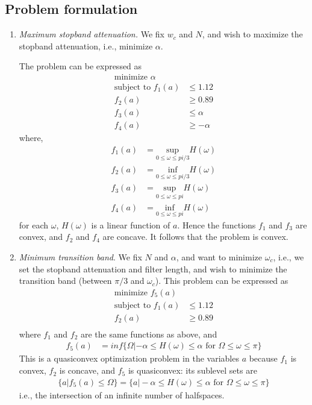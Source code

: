 \documentclass[conference]{IEEEtran}
\begin{document}
\subsection{Problem formulation}
\begin{enumerate}[label=(\alph*)]
\item \textit{Maximum stopband attenuation.} We fix $w_c$ and $N$, and wish to maximize the stopband attenuation, i.e., minimize $\alpha$.

The problem can be expressed as
\begin{align}
\text{minimize } \alpha\\
\text{subject to } f_1(a)&\le 1.12\\
				   f_2(a)&\ge 0.89\\
				   f_3(a)&\le \alpha\\
				   f_4(a)&\ge -\alpha
\end{align}
where,
\begin{align}
f_1(a) &= \underset{0\le \omega \le pi/3}{\text{sup}}H(\omega)\\
f_2(a) &= \underset{0\le \omega \le pi/3}{\text{inf}}H(\omega)\\
f_3(a) &= \underset{0\le \omega \le pi}{\text{sup}}H(\omega)\\
f_4(a) &= \underset{0\le \omega \le pi}{\text{inf}}H(\omega)
\end{align}
for each $\omega$, $H(\omega)$ is a linear function of $a$. Hence the functions $f_1$ and $f_3$ are convex, and $f_2$ and $f_4$ are concave. It follows that the problem is convex.

\item \textit{Minimum transition band}. We fix $N$ and $\alpha$, and want to minimize $\omega_c$, i.e., we set the stopband attenuation and filter length, and wish to minimize the transition band (between $\pi/3$ and $\omega_c$).
This problem can be expressed as
\begin{align}
\text{minimize } f_5(a)\\
\text{subject to } f_1(a)&\le 1.12\\
				   f_2(a)&\ge 0.89\\
\end{align}
where $f_1$ and $f_2$ are the same functions as above, and
\begin{align}
f_5(a) &= inf\{\Omega| -\alpha\le H(\omega)\le \alpha \text{ for } \Omega \le \omega \le \pi\}
\end{align}
This is a quasiconvex optimization problem in the variables $a$ because $f_1$ is convex, $f_2$ is concave, and $f_5$ is quasiconvex: its sublevel sets are
\begin{align}
\{a | f_5(a)\le\Omega\} = \{a| -\alpha\le H(\omega)\le \alpha \text{ for } \Omega \le \omega \le \pi\}
\end{align}
i.e., the intersection of an infinite number of halfspaces.


\end{enumerate}
\end{document}
